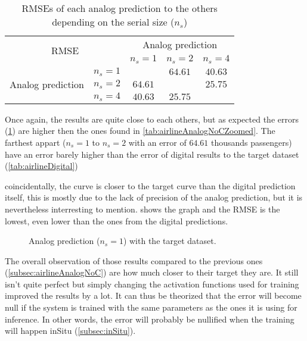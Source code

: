 \begin{table}[H]
  \centering
  \begin{tabular}{|c|c|c|c|c|}
    \hline
    \multicolumn{2}{|c}{\multirow{2}{*}{\ac{RMSE}}} & \multicolumn{3}{|c|}{Analog prediction}\\
    \cline{3-5}
    \multicolumn{2}{|c}{} & \multicolumn{1}{|c|}{$n_s=1$} & $n_s=2$ & $n_s=4$ \\
    \hline
    \multirow{3}{*}{Analog prediction} & $n_s=1$ &\cellcolor[HTML]{202020} & $64.61$ & $40.63$\\
    \cline{2-5}
    & $n_s=2$  & $64.61$ & \cellcolor[HTML]{202020} & $25.75$\\
    \cline{2-5}
    & $n_s=4$ & $40.63$ & $25.75$ & \cellcolor[HTML]{202020}\\
    \hline
  \end{tabular}
  \caption{\acp{RMSE} of each analog prediction to the others depending on the serial size ($n_s$)}
  \label{tab:airlineAnalogError}
\end{table}

Once again, the results are quite close to each others, but as expected the errors (\cref{tab:airlineAnalogError}) are higher then the ones found in \cref{tab:airlineAnalogNoCZoomed}. The farthest appart ($n_s=1$ to $n_s=2$ with an error of $64.61$ thousands passengers) have an error barely higher than the error of digital results to the target dataset (\cref{tab:airlineDigital})

coincidentally, the curve is closer to the target curve than the digital prediction itself, this is mostly due to the lack of precision of the analog prediction, but it is nevertheless interresting to mention.  shows the graph and the \ac{RMSE} is the lowest, even lower than the ones from the digital predictions.

\begin{figure}[H]
  \centering
  
  \caption{Analog prediction ($n_s=1$) with the target dataset.}
  \label{graph:airlineCoin}
\end{figure}

The overall observation of those results compared to the previous ones (\cref{subsec:airlineAnalogNoC}) are how much closer to their target they are. It still isn't quite perfect but simply changing the activation functions used for training improved the results by a lot. It can thus be theorized that the error will become null if the system is trained with the same parameters as the ones it is using for inference. In other words, the error will probably be nullified when the training will happen inSitu (\cref{subsec:inSitu}).
